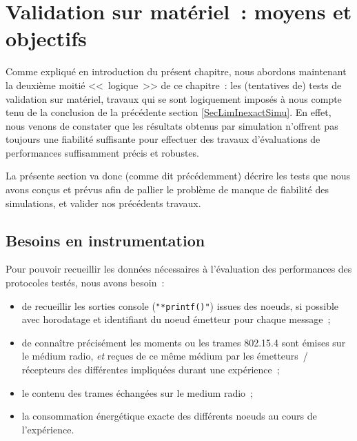 
\section{Validation sur matériel~: moyens et objectifs}
\label{SecObjectifs}

Comme expliqué en introduction du présent chapitre, nous abordons maintenant
la deuxième moitié <<~logique~>> de ce chapitre~: les (tentatives de) tests
de validation sur matériel, travaux qui se sont logiquement imposés à nous
compte tenu de la conclusion de la précédente section \ref{SecLimInexactSimu}.
En effet, nous venons de constater que les résultats obtenus par simulation
n'offrent pas toujours une fiabilité suffisante pour effectuer des travaux
d'évaluations de performances suffisamment précis et robustes.

La présente section va donc (comme dit précédemment) décrire les tests que
nous avons conçus et prévus afin de pallier le problème de manque de
fiabilité des simulations, et valider nos précédents travaux.


\subsection{Besoins en instrumentation}
\label{SubsecBesoinsInstr}

Pour pouvoir recueillir les données nécessaires à l'évaluation des
performances des protocoles testés, nous avons besoin~:

\begin{itemize}

\item de recueillir les sorties console (\texttt{"*printf()"}) issues
des noeuds, si possible avec horodatage et identifiant du noeud émetteur
pour chaque message~;

\item de connaître précisément les moments ou les trames 802.15.4 sont
émises sur le médium radio, \emph{et} reçues de ce même médium par les
émetteurs~/ récepteurs des différentes  impliquées durant
une expérience~;

\item le contenu des trames échangées sur le medium radio~;

\item la consommation énergétique exacte des différents noeuds au cours
de l'expérience.

\end{itemize}

